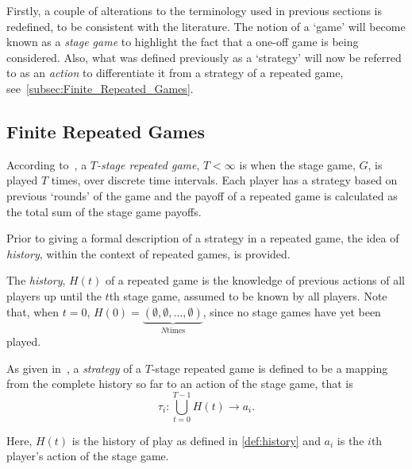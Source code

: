 Firstly, a couple of alterations to the terminology used in
previous sections is redefined, to be consistent with the
literature. The notion of a `game' will become known as a
\textit{stage game} to highlight the fact that a one-off game is being
considered. Also, what was defined previously as a `strategy' will now be
referred to as an \textit{action} to differentiate it from a strategy of a
repeated game, see~\autoref{subsec:Finite_Repeated_Games}.

\subsection{Finite Repeated Games}\label{subsec:Finite_Repeated_Games}
According to~\cite{Knight2017a}, a \textit{\(T\)-stage repeated game}, \(T <
\infty \) is when the stage game, \(G\), is played \(T\) times, over discrete
time intervals. Each player has a strategy based on previous `rounds' of
the game and the payoff of a repeated game is calculated as the total sum of the
stage game payoffs.

Prior to giving a formal description of a strategy in a repeated game, the idea
of \textit{history}, within the context of repeated games, is provided.

\begin{definition}
    The \textit{history}, \(H(t)\) of a repeated game is the knowledge of
    previous actions of all players up until the \(t\)th stage game, assumed to
    be known by all players. Note that, when \(t=0\), \(H(0) =
\underbrace{(\emptyset, \emptyset, \ldots, \emptyset)}_{N \text{times}}\), since
no stage games have yet been played.
\end{definition}\label{def:history}

\begin{definition}
    As given in~\cite{Knight2019a,maschler_solan_zamir_2013}, a
    \textit{strategy} of a \(T\)-stage repeated
    game is defined to be a mapping from the complete history so far to an
    action of the stage game, that is 
    \begin{equation}
        \tau_{i} : \bigcup_{t = 0}^{T-1}{H(t)} \to a_{i}.
    \end{equation}    
\end{definition}

Here, \(H(t)\) is the history of play as defined in \autoref{def:history} and
\(a_{i}\) is the \(i\)th player's action of the stage game. 

